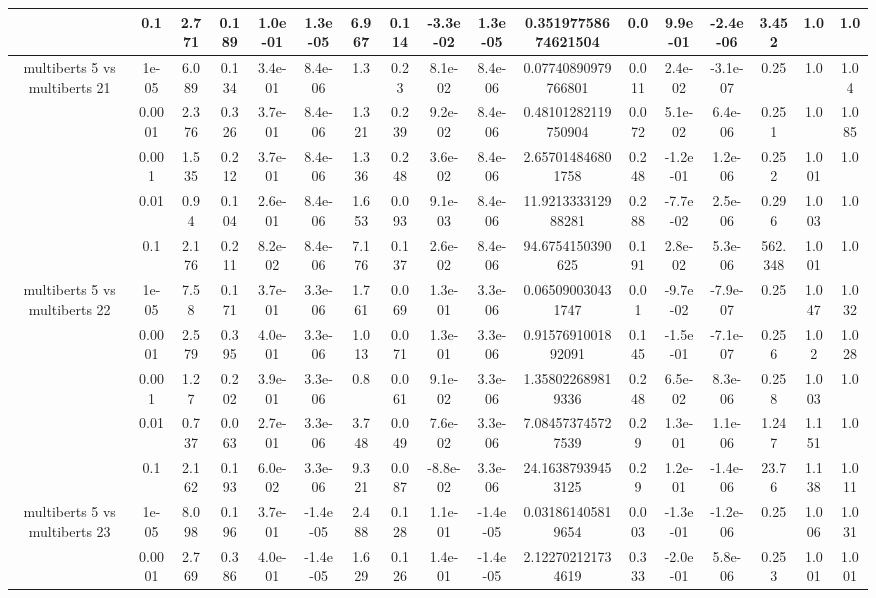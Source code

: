 \begin{tabular}{|c|c|c|c|c|c|c|c|c|c|c|c|c|c|c|c|c|}
 & 0.1 & 2.771 & 0.189 & 1.0e-01 & 1.3e-05 & 6.967 & 0.114 & -3.3e-02 & 1.3e-05 & 0.35197758674621504 & 0.0 & 9.9e-01 & -2.4e-06 & 3.452 & 1.0 & 1.0 \\
\hline
\multirow{5}{*}{multiberts 5 vs multiberts 21} & 1e-05 & 6.089 & 0.134 & 3.4e-01 & 8.4e-06 & 1.3 & 0.23 & 8.1e-02 & 8.4e-06 & 0.07740890979766801 & 0.011 & 2.4e-02 & -3.1e-07 & 0.25 & 1.0 & 1.04 \\
 & 0.0001 & 2.376 & 0.326 & 3.7e-01 & 8.4e-06 & 1.321 & 0.239 & 9.2e-02 & 8.4e-06 & 0.48101282119750904 & 0.072 & 5.1e-02 & 6.4e-06 & 0.251 & 1.0 & 1.085 \\
 & 0.001 & 1.535 & 0.212 & 3.7e-01 & 8.4e-06 & 1.336 & 0.248 & 3.6e-02 & 8.4e-06 & 2.657014846801758 & 0.248 & -1.2e-01 & 1.2e-06 & 0.252 & 1.001 & 1.0 \\
 & 0.01 & 0.94 & 0.104 & 2.6e-01 & 8.4e-06 & 1.653 & 0.093 & 9.1e-03 & 8.4e-06 & 11.921333312988281 & 0.288 & -7.7e-02 & 2.5e-06 & 0.296 & 1.003 & 1.0 \\
 & 0.1 & 2.176 & 0.211 & 8.2e-02 & 8.4e-06 & 7.176 & 0.137 & 2.6e-02 & 8.4e-06 & 94.6754150390625 & 0.191 & 2.8e-02 & 5.3e-06 & 562.348 & 1.001 & 1.0 \\
\hline
\multirow{5}{*}{multiberts 5 vs multiberts 22} & 1e-05 & 7.58 & 0.171 & 3.7e-01 & 3.3e-06 & 1.761 & 0.069 & 1.3e-01 & 3.3e-06 & 0.065090030431747 & 0.01 & -9.7e-02 & -7.9e-07 & 0.25 & 1.047 & 1.032 \\
 & 0.0001 & 2.579 & 0.395 & 4.0e-01 & 3.3e-06 & 1.013 & 0.071 & 1.3e-01 & 3.3e-06 & 0.9157691001892091 & 0.145 & -1.5e-01 & -7.1e-07 & 0.256 & 1.02 & 1.028 \\
 & 0.001 & 1.27 & 0.202 & 3.9e-01 & 3.3e-06 & 0.8 & 0.061 & 9.1e-02 & 3.3e-06 & 1.358022689819336 & 0.248 & 6.5e-02 & 8.3e-06 & 0.258 & 1.003 & 1.0 \\
 & 0.01 & 0.737 & 0.063 & 2.7e-01 & 3.3e-06 & 3.748 & 0.049 & 7.6e-02 & 3.3e-06 & 7.084573745727539 & 0.29 & 1.3e-01 & 1.1e-06 & 1.247 & 1.151 & 1.0 \\
 & 0.1 & 2.162 & 0.193 & 6.0e-02 & 3.3e-06 & 9.321 & 0.087 & -8.8e-02 & 3.3e-06 & 24.16387939453125 & 0.29 & 1.2e-01 & -1.4e-06 & 23.76 & 1.138 & 1.011 \\
\hline
\multirow{5}{*}{multiberts 5 vs multiberts 23} & 1e-05 & 8.098 & 0.196 & 3.7e-01 & -1.4e-05 & 2.488 & 0.128 & 1.1e-01 & -1.4e-05 & 0.031861405819654 & 0.003 & -1.3e-01 & -1.2e-06 & 0.25 & 1.006 & 1.031 \\
 & 0.0001 & 2.769 & 0.386 & 4.0e-01 & -1.4e-05 & 1.629 & 0.126 & 1.4e-01 & -1.4e-05 & 2.122702121734619 & 0.333 & -2.0e-01 & 5.8e-06 & 0.253 & 1.001 & 1.001 \\

\end{tabular}

